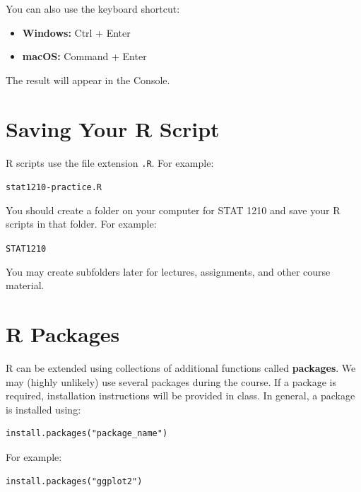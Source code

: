 \documentclass[11pt]{article}
\begin{document}
You can also use the keyboard shortcut:

\begin{itemize}
    \item \textbf{Windows:} Ctrl + Enter
    \item \textbf{macOS:} Command + Enter
\end{itemize}

The result will appear in the Console.


\section{Saving Your R Script}
R scripts use the file extension \texttt{.R}. For example:

\begin{center}
\texttt{stat1210-practice.R}
\end{center}

You should create a folder on your computer for STAT 1210 and save your R scripts in that folder. For example:

\begin{center}
\texttt{STAT1210}
\end{center}

You may create subfolders later for lectures, assignments, and other course material.


\section{R Packages}
R can be extended using collections of additional functions called \textbf{packages}. We may (highly unlikely)  use several packages during the course. If a package is required, installation instructions will be provided in class. In general, a package is installed using:

\begin{lstlisting}
install.packages("package_name")
\end{lstlisting}

For example:

\begin{lstlisting}
install.packages("ggplot2")
\end{lstlisting}
\end{document}
